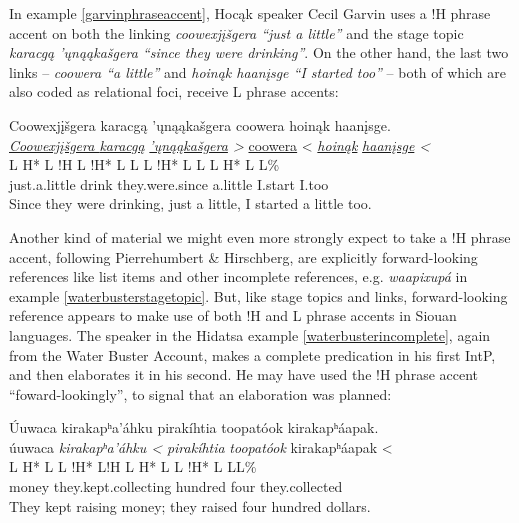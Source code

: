 \documentclass[output=paper]{LSP/langsci}
\begin{document}
In example \ref{garvinphraseaccent}, Hocąk speaker Cecil Garvin uses a !H phrase accent on both the linking \emph{coowexjįšgera “just a little”} and the stage topic \emph{karacgą ’ųnąąkašgera “since they were drinking”}. On the other hand, the last two links -- \emph{coowera “a little”} and \emph{hoinąk	haanįsge “I started too”} -- both of which are also coded as relational foci, receive L phrase accents:

\ea\label{garvinphraseaccent}
 	Coowexjįšgera karacgą ’ųnąąkašgera coowera hoinąk haanįsge.\footnotemark\\
\glll	\emph{\underline{Coowexjįšgera	}}	\emph{\underline{karacgą}}	\emph{\underline{’ųnąąkašgera}	>}	{\underline{coowera} <}	\emph{\underline{hoinąk}}	\emph{\underline{haanįsge} <}\\
	{\ob L H* L !H\cb}				{\ob L !H* L}				{L\cb}	{\ob L !H* L L\cb}		{\ob L H* L}						{\hspaceThis{haanįs}\ob\hspaceThis{ }L\%}\\
	just.a.little					drink					they.were.since				a.little				I.start						I.too\\
\glt	Since they were drinking, just a little, I started a little too.
\z

Another kind of material we might even more strongly expect to take a !H phrase accent, following Pierrehumbert \& Hirschberg, are explicitly forward-looking references like list items and other incomplete references, e.g. \emph{waapixupá} in example \ref{waterbusterstagetopic}. But, like stage topics and links, forward-looking reference appears to make use of both !H and L phrase accents in Siouan languages. The speaker in the Hidatsa example \ref{waterbusterincomplete}, again from the Water Buster Account, makes a complete predication in his first IntP, and then elaborates it in his second. He may have used the !H phrase accent “foward-lookingly”, to signal that an elaboration was planned:

\ea\label{waterbusterincomplete}
 	Úuwaca kirakapʰa’áhku pirakíhtia toopatóok kirakapʰáapak.\footnotemark\\
\glll	úuwaca	\emph{kirakapʰa’áhku <}		\emph{pirakíhtia}	\emph{toopatóok}	{kirakapʰáapak <}\\
	{\ob L H* L}	{L !H* L!H\cb}	{\ob L H* L}		{}			{L !H* L L\cb{}L\%}\\
	money	they.kept.collecting			hundred		four			they.collected\\
\glt	They kept raising money; they raised four hundred dollars.
\z
\end{document}
